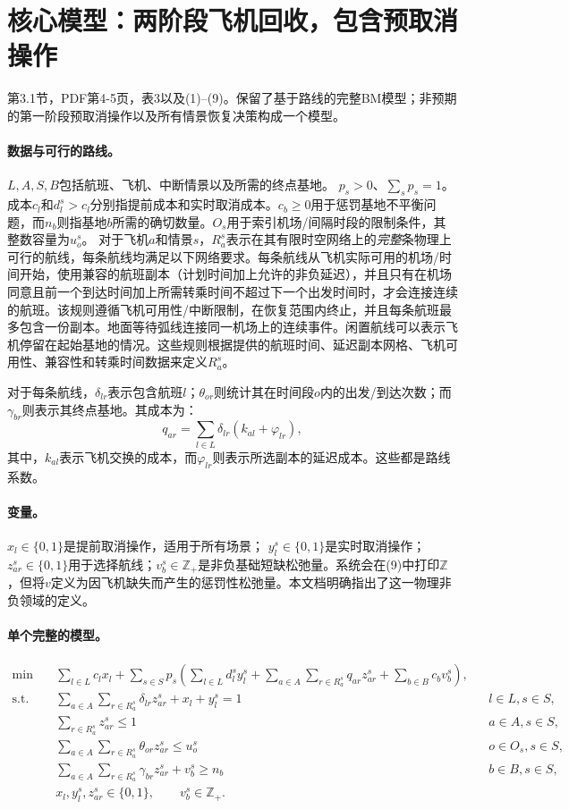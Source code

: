 \documentclass[11pt]{article}
\begin{document}
\section*{核心模型：两阶段飞机回收，包含预取消操作}
第3.1节，PDF第4-5页，表3以及(1)--(9)。保留了基于路线的完整BM模型；非预期的第一阶段预取消操作以及所有情景恢复决策构成一个模型。
\paragraph{数据与可行的路线。}
$L,A,S,B$包括航班、飞机、中断情景以及所需的终点基地。  
$p_s>0$、$\sum_s p_s=1$。成本$c_l$和$d_l^s>c_l$分别指提前成本和实时取消成本。$c_b\ge0$用于惩罚基地不平衡问题，而$n_b$则指基地$b$所需的确切数量。$O_s$用于索引机场/间隔时段的限制条件，其整数容量为$u_o^s$。  
对于飞机$a$和情景$s$，$R_a^s$表示在其有限时空网络上的\emph{完整}条物理上可行的航线，每条航线均满足以下网络要求。每条航线从飞机实际可用的机场/时间开始，使用兼容的航班副本（计划时间加上允许的非负延迟），并且只有在机场同意且前一个到达时间加上所需转乘时间不超过下一个出发时间时，才会连接连续的航班。该规则遵循飞机可用性/中断限制，在恢复范围内终止，并且每条航班最多包含一份副本。地面等待弧线连接同一机场上的连续事件。闲置航线可以表示飞机停留在起始基地的情况。这些规则根据提供的航班时间、延迟副本网格、飞机可用性、兼容性和转乘时间数据来定义$R_a^s$。

对于每条航线，$\delta_{lr}$表示包含航班$l$；$\theta_{or}$则统计其在时间段$o$内的出发/到达次数；而$\gamma_{br}$则表示其终点基地。其成本为：
\[
 q_{ar}=\sum_{l\in L}\delta_{lr}(k_{al}+\varphi_{lr}),
\]
其中，$k_{al}$表示飞机交换的成本，而$\varphi_{lr}$则表示所选副本的延迟成本。这些都是路线系数。
\paragraph{变量。}
$x_l\in\{0,1\}$是提前取消操作，适用于所有场景；  
$y_l^s\in\{0,1\}$是实时取消操作；  
$z_{ar}^s\in\{0,1\}$用于选择航线；$v_b^s\in\mathbb Z_+$是非负基础短缺松弛量。系统会在(9)中打印$\mathbb Z$，但将$v$定义为因飞机缺失而产生的惩罚性松弛量。本文档明确指出了这一物理非负领域的定义。
\paragraph{单个完整的模型。}
\begin{align}
\min\quad &\sum_{l\in L}c_lx_l+
 \sum_{s\in S}p_s\left(\sum_{l\in L}d_l^s y_l^s+
 \sum_{a\in A}\sum_{r\in R_a^s}q_{ar}z_{ar}^s+
 \sum_{b\in B}c_bv_b^s\right),\tag{1}\\
\text{s.t.}\quad &\sum_{a\in A}\sum_{r\in R_a^s}\delta_{lr}z_{ar}^s+x_l+y_l^s=1
 &&l\in L,s\in S,\tag{2}\\
&\sum_{r\in R_a^s}z_{ar}^s\le1 &&a\in A,s\in S,\tag{3}\\
&\sum_{a\in A}\sum_{r\in R_a^s}\theta_{or}z_{ar}^s\le u_o^s
 &&o\in O_s,s\in S,\tag{4}\\
&\sum_{a\in A}\sum_{r\in R_a^s}\gamma_{br}z_{ar}^s+v_b^s\ge n_b
 &&b\in B,s\in S,\tag{5}\\
&x_l,y_l^s,z_{ar}^s\in\{0,1\},\qquad v_b^s\in\mathbb Z_+.
\end{align}
\end{document}
